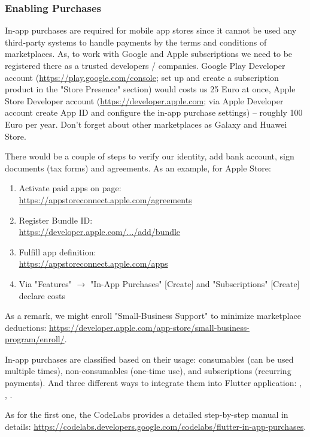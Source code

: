 \subsubsection{Enabling Purchases}

In-app purchases are required for mobile app stores since it cannot be used any third-party systems to handle payments
by the terms and conditions of marketplaces. As, to work with Google and Apple subscriptions we need to be registered 
there as a trusted developers / companies. Google Play Developer account 
(\href{https://play.google.com/console}{https://play.google.com/console}; set up and create a subscription product in 
the "Store Presence" section) would costs us 25 Euro at once, Apple Store Developer account 
(\href{https://developer.apple.com}{https://developer.apple.com}; via Apple Developer account create App ID and 
configure the in-app purchase settings) -- roughly 100 Euro per year. Don't forget about other marketplaces as 
Galaxy and Huawei Store.

There would be a couple of steps to verify our identity, add bank account, sign documents (tax forms) and agreements.
As an example, for Apple Store:
\begin{enumerate}
  \item Activate paid apps on page:\\
  \href{https://appstoreconnect.apple.com/agreements}{https://appstoreconnect.apple.com/agreements}
  \item Register Bundle ID:\\
  \href{https://developer.apple.com/account/resources/identifiers/bundleId/add/bundle}{https://developer.apple.com/.../add/bundle}
  \item Fulfill app definition:\\
  \href{https://appstoreconnect.apple.com/apps}{https://appstoreconnect.apple.com/apps}
  \item Via "Features" $\rightarrow$ "In-App Purchases" [Create] and "Subscriptions" [Create] declare costs
\end{enumerate}

\noindent As a remark, we might enroll "Small-Business Support" to minimize marketplace deductions:
\href{https://developer.apple.com/app-store/small-business-program/enroll/}{https://developer.apple.com/app-store/small-business-program/enroll/}.

In-app purchases are classified based on their usage: consumables (can be used multiple times), non-consumables 
(one-time use), and subscriptions (recurring payments). And three different ways to integrate them into Flutter 
application: , , . 

As for the first one, the CodeLabs provides a detailed step-by-step manual in details:
\href{https://codelabs.developers.google.com/codelabs/flutter-in-app-purchases}{https://codelabs.developers.google.com/codelabs/flutter-in-app-purchases}.



\noindent {}
